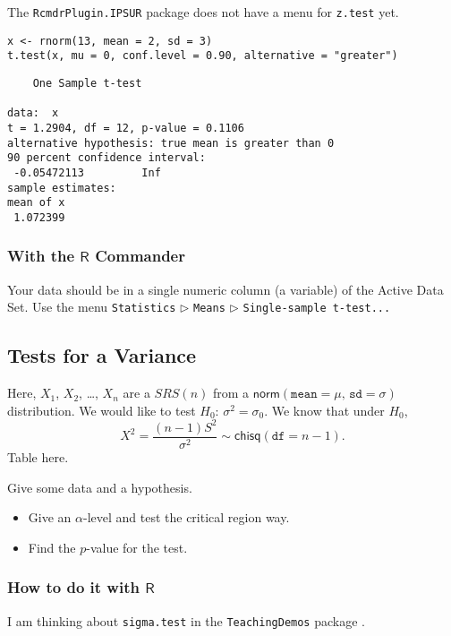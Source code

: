 The \texttt{RcmdrPlugin.IPSUR} package \cite{RcmdrPlugin.IPSUR} does not have
a menu for \texttt{z.test} yet.

\begin{verbatim}
x <- rnorm(13, mean = 2, sd = 3)
t.test(x, mu = 0, conf.level = 0.90, alternative = "greater")
\end{verbatim}

\begin{verbatim}
	One Sample t-test

data:  x
t = 1.2904, df = 12, p-value = 0.1106
alternative hypothesis: true mean is greater than 0
90 percent confidence interval:
 -0.05472113         Inf
sample estimates:
mean of x 
 1.072399
\end{verbatim}

\subsubsection{With the \(\mathsf{R}\) Commander}
\label{sec-10-3-1-2}

Your data should be in a single numeric column (a variable) of the
Active Data Set. Use the menu \texttt{Statistics} \(\triangleright\) \texttt{Means}
\(\triangleright\) \texttt{Single-sample t-test...}

\subsection{Tests for a Variance}
\label{sec-10-3-2}

Here, \(X_{1}\), \(X_{2}\), \ldots{}, \(X_{n}\) are a \(SRS(n)\) from a
\(\mathsf{norm}(\mathtt{mean} = \mu,\,\mathtt{sd} = \sigma)\)
distribution. We would like to test \(H_{0}:\,\sigma^{2} =
\sigma_{0}\). We know that under \(H_{0}\), \[ X^{2} = \frac{(n -
1)S^{2}}{\sigma^{2}} \sim \mathsf{chisq}(\mathtt{df} = n - 1).  \]
Table here.


Give some data and a hypothesis.
\begin{itemize}
\item Give an \(\alpha\)-level and test the critical region way.
\item Find the \(p\)-value for the test.
\end{itemize}

\subsubsection{How to do it with \(\mathsf{R}\)}
\label{sec-10-3-2-1}
I am thinking about \texttt{sigma.test}
 in the
\texttt{TeachingDemos} package \cite{TeachingDemos}.


